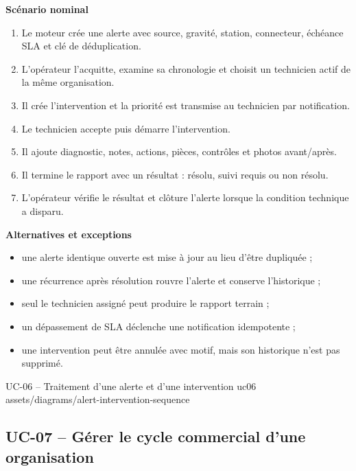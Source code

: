 \textbf{Scénario nominal}
\begin{enumerate}[leftmargin=8mm]
  \item Le moteur crée une alerte avec source, gravité, station, connecteur, échéance
  SLA et clé de déduplication.
  \item L'opérateur l'acquitte, examine sa chronologie et choisit un technicien actif
  de la même organisation.
  \item Il crée l'intervention et la priorité est transmise au technicien par
  notification.
  \item Le technicien accepte puis démarre l'intervention.
  \item Il ajoute diagnostic, notes, actions, pièces, contrôles et photos avant/après.
  \item Il termine le rapport avec un résultat : résolu, suivi requis ou non résolu.
  \item L'opérateur vérifie le résultat et clôture l'alerte lorsque la condition
  technique a disparu.
\end{enumerate}

\textbf{Alternatives et exceptions}
\begin{itemize}[leftmargin=7mm]
  \item une alerte identique ouverte est mise à jour au lieu d'être dupliquée ;
  \item une récurrence après résolution rouvre l'alerte et conserve l'historique ;
  \item seul le technicien assigné peut produire le rapport terrain ;
  \item un dépassement de SLA déclenche une notification idempotente ;
  \item une intervention peut être annulée avec motif, mais son historique n'est pas
  supprimé.
\end{itemize}

\UseCaseUmlPlate
  {UC-06 -- Traitement d'une alerte et d'une intervention}
  {uc06}
  {assets/diagrams/alert-intervention-sequence}

\subsection{UC-07 -- Gérer le cycle commercial d'une organisation}

